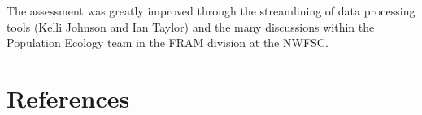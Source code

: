 \documentclass[11pt,
  english,
  a4paper,
]{article}
\begin{document}

The assessment was greatly improved through the streamlining of data processing tools (Kelli Johnson and Ian Taylor) and the many discussions within the Population Ecology team in the FRAM division at the NWFSC.

\leavevmode\tagmcend\tagstructend\par

\clearpage


\hypertarget{references}{%
\section{References}\label{references}}

\leavevmode\tagmcend\tagstructend

\end{document}
